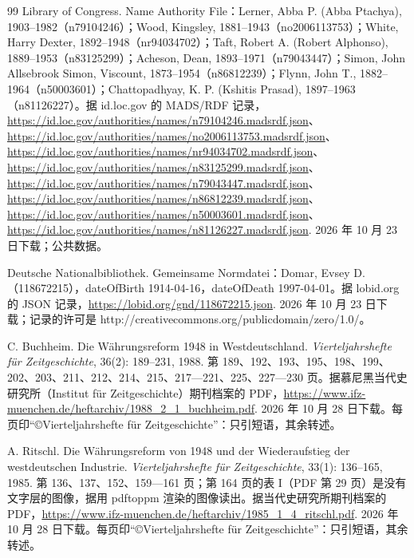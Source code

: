 \begin{thebibliography}{99}
 Library of Congress. Name Authority File：Lerner, Abba P. (Abba Ptachya), 1903--1982（n79104246）；Wood, Kingsley, 1881--1943（no2006113753）；White, Harry Dexter, 1892--1948（nr94034702）；Taft, Robert A. (Robert Alphonso), 1889--1953（n83125299）；Acheson, Dean, 1893--1971（n79043447）；Simon, John Allsebrook Simon, Viscount, 1873--1954（n86812239）；Flynn, John T., 1882--1964（n50003601）；Chattopadhyay, K. P. (Kshitis Prasad), 1897--1963（n81126227）。据 id.loc.gov 的 MADS/RDF 记录，\url{https://id.loc.gov/authorities/names/n79104246.madsrdf.json}、\url{https://id.loc.gov/authorities/names/no2006113753.madsrdf.json}、\url{https://id.loc.gov/authorities/names/nr94034702.madsrdf.json}、\url{https://id.loc.gov/authorities/names/n83125299.madsrdf.json}、\url{https://id.loc.gov/authorities/names/n79043447.madsrdf.json}、\url{https://id.loc.gov/authorities/names/n86812239.madsrdf.json}、\url{https://id.loc.gov/authorities/names/n50003601.madsrdf.json}、\url{https://id.loc.gov/authorities/names/n81126227.madsrdf.json}. 2026 年 10 月 23 日下载；公共数据。

 Deutsche Nationalbibliothek. Gemeinsame Normdatei：Domar, Evsey D.（118672215），dateOfBirth 1914-04-16，dateOfDeath 1997-04-01。据 lobid.org 的 JSON 记录，\url{https://lobid.org/gnd/118672215.json}. 2026 年 10 月 23 日下载；记录的许可是 http://creativecommons.org/publicdomain/zero/1.0/。

 C. Buchheim. Die Währungsreform 1948 in Westdeutschland. \emph{Vierteljahrshefte für Zeitgeschichte}, 36(2): 189--231, 1988. 第 189、192、193、195、198、199、202、203、211、212、214、215、217—221、225、227—230 页。据慕尼黑当代史研究所（Institut für Zeitgeschichte）期刊档案的 PDF，\url{https://www.ifz-muenchen.de/heftarchiv/1988_2_1_buchheim.pdf}. 2026 年 10 月 28 日下载。每页印“©Vierteljahrshefte für Zeitgeschichte”：只引短语，其余转述。

 A. Ritschl. Die Währungsreform von 1948 und der Wiederaufstieg der westdeutschen Industrie. \emph{Vierteljahrshefte für Zeitgeschichte}, 33(1): 136--165, 1985. 第 136、137、152、159—161 页；第 164 页的表 I（PDF 第 29 页）是没有文字层的图像，据用 pdftoppm 渲染的图像读出。据当代史研究所期刊档案的 PDF，\url{https://www.ifz-muenchen.de/heftarchiv/1985_1_4_ritschl.pdf}. 2026 年 10 月 28 日下载。每页印“©Vierteljahrshefte für Zeitgeschichte”：只引短语，其余转述。


\end{thebibliography}
